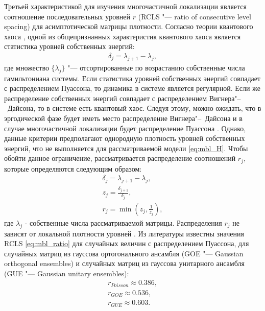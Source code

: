 Третьей характеристикой для изучения многочастичной локализации является соотношение последовательных уровней \(r\) (RCLS "--- ratio of consecutive level spacing) для асимптотической матрицы плотности.
Согласно теории квантового хаоса \cite{Haake2018}, одной из общепризнанных характеристик квантового хаоса является статистика уровней собственных энергий:
\begin{equation}
\label{eq:mbl_energy_levels}
\begin{gathered}
\delta_j = \lambda_{j+1} - \lambda_{j}, 
\end{gathered}
\end{equation}
где множество \(\{\lambda_j\}\) "--- отсортированные по возрастанию собственные числа гамильтониана системы.
Если статистика уровней собственных энергий совпадает с распределением Пуассона, то динамика в системе является регулярной.
Если же распределение собственных энергий совпадает с распределением Вигнера"--~Дайсона, то в системе есть квантовый хаос.
Следуя этому, можно ожидать, что в эргодической фазе будет иметь место распределение Вигнера"--~Дайсона и в случае многочастичной локализации будет распределение Пуассона \cite{Oganesyan2007, Serbyn2016}.
Однако, данные критерии предполагают однородную плотность уровней собственных энергий, что не выполняется для рассматриваемой модели \cref{eq:mbl_H}.
Чтобы обойти данное ограничение, рассматривается распределение соотношений \(r_j\), которые определяются следующим образом:
\begin{equation}
\label{eq:mbl_ratio}
\begin{gathered}
\delta_j = \lambda_{j+1} - \lambda_{j}, \\
z_j = \frac{\delta_{j+1}}{\delta_{j}}, \\
r_j = \min\left(z_j, \frac{1}{z_j} \right),
\end{gathered}
\end{equation}
где \(\lambda_{j}\) - собственные числа рассматриваемой матрицы. 
Распределения \(r_j\) не зависят от локальной плотности уровней \cite{Oganesyan2007}.
Из литературы \cite{Atas2013} известны значения RCLS \cref{eq:mbl_ratio} для случайных величин с распределением Пуассона, для случайных матриц \cite{mehta2004random} из гауссова ортогонального ансамбля (GOE "--- Gaussian orthogonal ensembles) и случайных матриц из гауссова унитарного ансамбля (GUE "--- Gaussian unitary ensembles):
\begin{equation}
\label{eq:mbl_ratio_constants}
\begin{gathered}
r_{Poisson} \approx 0.386, \\
r_{GOE} \approx 0.536, \\
r_{GUE} \approx 0.603.
\end{gathered}
\end{equation}


